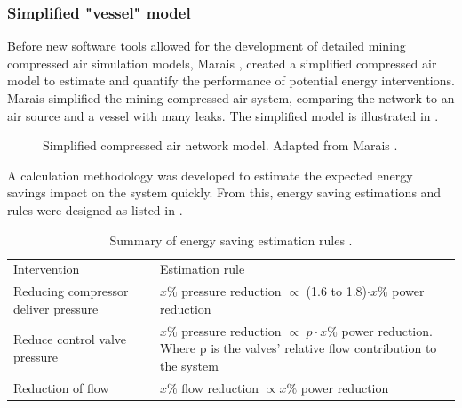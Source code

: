 		\subsubsection{Simplified "vessel" model}
		Before new software tools allowed for the development of detailed mining compressed air simulation models, Marais \cite{Marais2012PhD}, \cite{marais2013simplification} created a simplified compressed air model to estimate and quantify the performance of potential energy interventions. Marais simplified the mining compressed air system, comparing the network to an air source and a vessel with many leaks. The simplified model is illustrated in .
		\begin{figure}[h!]
			\centering
			\caption[Simplified compressed air netowrk model]{Simplified compressed air network model. Adapted from Marais \cite{Marais2012PhD}.}
			\label{fig:Marais vessel model}
		\end{figure}
		\par 
		A calculation methodology was developed to estimate the expected energy savings impact on the system quickly. From this, energy saving estimations and rules were designed as listed in . 
		\par 
		\begin{table}[h]
			\centering
			\begin{tabular}{p{}p{}p{}}
				\hline
				Intervention && Estimation rule\\
				\hhline{===} 
				Reducing compressor deliver pressure & & $x \%$ pressure reduction $\propto$ (1.6 to 1.8)$\cdot x\%$ power reduction \newline \\
				Reduce control valve pressure & &$x \%$ pressure reduction $\propto$ $p\cdot x\%$ power reduction. \newline \newline Where p is the valves' relative flow contribution to the system \newline \\
				Reduction of flow && $x \%$ flow reduction $\propto x \%$ power reduction \newline\\
				\hline
			\end{tabular} 
			\caption[Summary of energy saving estimation rules]{Summary of energy saving estimation rules \cite{Marais2012PhD}.}
			\label{table: Rules of thumb}
		\end{table}
